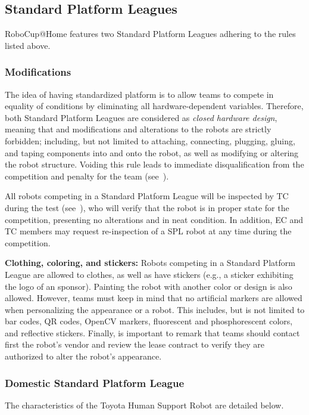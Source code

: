 \subsection{Standard Platform Leagues}
RoboCup@Home features two Standard Platform Leagues adhering to the rules listed above.

\subsubsection{Modifications}
\label{rule:spl-mods}
The idea of having standardized platform is to allow teams to compete in equality of conditions by eliminating all hardware-dependent variables. Therefore, both Standard Platform Leagues are considered as \emph{closed hardware design}, meaning that and modifications and alterations to the robots are strictly forbidden; including, but not limited to attaching, connecting, plugging, gluing, and taping components into and onto the robot, as well as modifying or altering the robot structure. Voiding this rule leads to immediate disqualification from the competition and penalty for the team (see~).

All robots competing in a Standard Platform League will be inspected by TC during the  test (see~), who will verify that the robot is in proper state for the competition, presenting no alterations and in neat condition. In addition, EC and TC members may request re-inspection of a SPL robot at any time during the competition.

\textbf{Clothing, coloring, and stickers:} Robots competing in a Standard Platform League are allowed to  clothes, as well as have stickers (e.g., a sticker exhibiting the logo of an sponsor). Painting the robot with another color or design is also allowed. However, teams must keep in mind that no artificial markers are allowed when personalizing the appearance or a robot. This includes, but is not limited to bar codes, QR codes, OpenCV markers, fluorescent and phosphorescent colors, and reflective stickers. Finally, is important to remark that teams should contact first the robot's vendor and review the lease contract to verify they are authorized to alter the robot's appearance.

\subsubsection{Domestic Standard Platform League}
The characteristics of the Toyota Human Support Robot are detailed below.

